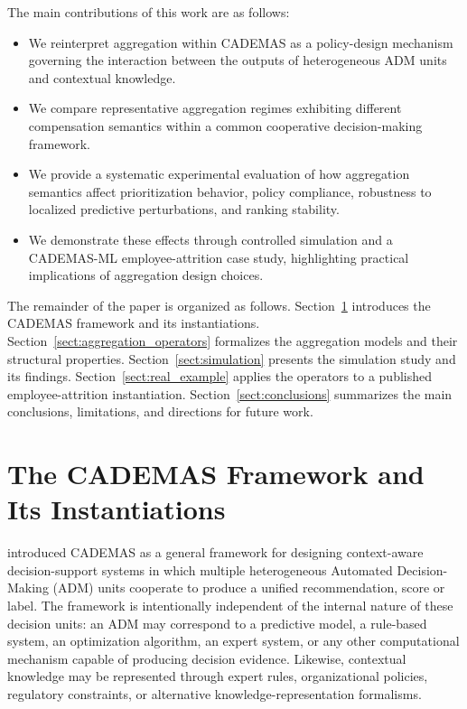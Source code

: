 \documentclass[mathematics,article,submit,moreauthors]{Definitions/mdpi}
\begin{document}
The main contributions of this work are as follows:

\begin{itemize}
\item We reinterpret aggregation within CADEMAS as a policy-design mechanism governing the interaction between the outputs of heterogeneous ADM units and contextual knowledge.

\item We compare representative aggregation regimes exhibiting different compensation semantics within a common cooperative decision-making framework.

\item We provide a systematic experimental evaluation of how aggregation semantics affect prioritization behavior, policy compliance, robustness to localized predictive perturbations, and ranking stability.

\item We demonstrate these effects through controlled simulation and a CADEMAS-ML employee-attrition case study, highlighting practical implications of aggregation design choices.

\end{itemize}

The remainder of the paper is organized as follows. Section~\ref{sect:cademas} introduces the CADEMAS framework and its instantiations. Section~\ref{sect:aggregation_operators} formalizes the aggregation models and their structural properties. Section~\ref{sect:simulation} presents the simulation study and its findings. Section~\ref{sect:real_example} applies the operators to a published employee-attrition instantiation. Section~\ref{sect:conclusions} summarizes the main conclusions, limitations, and directions for future work.

\section{The CADEMAS Framework and Its Instantiations}
\label{sect:cademas} 


\citet{NovoaHernandez2026} introduced CADEMAS as a general framework for designing context-aware decision-support systems in which multiple heterogeneous Automated Decision-Making (ADM) units cooperate to produce a unified recommendation, score or label. The framework is intentionally independent of the internal nature of these decision units: an ADM may correspond to a predictive model, a rule-based system, an optimization algorithm, an expert system, or any other computational mechanism capable of producing decision evidence. 
Likewise, contextual knowledge may be represented through expert rules, organizational policies, regulatory constraints, or alternative knowledge-representation formalisms.
\end{document}
